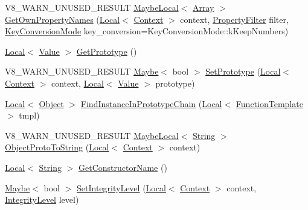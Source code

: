 \begin{DoxyCompactItemize}
\item 
V8\+\_\+\+W\+A\+R\+N\+\_\+\+U\+N\+U\+S\+E\+D\+\_\+\+R\+E\+S\+U\+LT \mbox{\hyperlink{classv8_1_1MaybeLocal}{Maybe\+Local}}$<$ \mbox{\hyperlink{classv8_1_1Array}{Array}} $>$ \mbox{\hyperlink{classv8_1_1Object_a345cc5b8e646c89bdf03b76f60544c91}{Get\+Own\+Property\+Names}} (\mbox{\hyperlink{classv8_1_1Local}{Local}}$<$ \mbox{\hyperlink{classv8_1_1Context}{Context}} $>$ context, \mbox{\hyperlink{namespacev8_afbf02b6b1152a3e25d7bde90798209ac}{Property\+Filter}} filter, \mbox{\hyperlink{namespacev8_aa65aeff871614520d8033dead4b34e38}{Key\+Conversion\+Mode}} key\+\_\+conversion=Key\+Conversion\+Mode\+::k\+Keep\+Numbers)
\item 
\mbox{\hyperlink{classv8_1_1Local}{Local}}$<$ \mbox{\hyperlink{classv8_1_1Value}{Value}} $>$ \mbox{\hyperlink{classv8_1_1Object_ae8d3fed7d6dbd667c29cabb3039fe7af}{Get\+Prototype}} ()
\item 
V8\+\_\+\+W\+A\+R\+N\+\_\+\+U\+N\+U\+S\+E\+D\+\_\+\+R\+E\+S\+U\+LT \mbox{\hyperlink{classv8_1_1Maybe}{Maybe}}$<$ bool $>$ \mbox{\hyperlink{classv8_1_1Object_a1f1fc25d2a440ad2a8b7d94db04f88fb}{Set\+Prototype}} (\mbox{\hyperlink{classv8_1_1Local}{Local}}$<$ \mbox{\hyperlink{classv8_1_1Context}{Context}} $>$ context, \mbox{\hyperlink{classv8_1_1Local}{Local}}$<$ \mbox{\hyperlink{classv8_1_1Value}{Value}} $>$ prototype)
\item 
\mbox{\hyperlink{classv8_1_1Local}{Local}}$<$ \mbox{\hyperlink{classv8_1_1Object}{Object}} $>$ \mbox{\hyperlink{classv8_1_1Object_ae2ad9fee9db6e0e5da56973ebb8ea2bc}{Find\+Instance\+In\+Prototype\+Chain}} (\mbox{\hyperlink{classv8_1_1Local}{Local}}$<$ \mbox{\hyperlink{classv8_1_1FunctionTemplate}{Function\+Template}} $>$ tmpl)
\item 
V8\+\_\+\+W\+A\+R\+N\+\_\+\+U\+N\+U\+S\+E\+D\+\_\+\+R\+E\+S\+U\+LT \mbox{\hyperlink{classv8_1_1MaybeLocal}{Maybe\+Local}}$<$ \mbox{\hyperlink{classv8_1_1String}{String}} $>$ \mbox{\hyperlink{classv8_1_1Object_a7a65552d78eff4a1b9755f99167f4255}{Object\+Proto\+To\+String}} (\mbox{\hyperlink{classv8_1_1Local}{Local}}$<$ \mbox{\hyperlink{classv8_1_1Context}{Context}} $>$ context)
\item 
\mbox{\hyperlink{classv8_1_1Local}{Local}}$<$ \mbox{\hyperlink{classv8_1_1String}{String}} $>$ \mbox{\hyperlink{classv8_1_1Object_a7bbe987794658f20a3ec1b68326305e6}{Get\+Constructor\+Name}} ()
\item 
\mbox{\hyperlink{classv8_1_1Maybe}{Maybe}}$<$ bool $>$ \mbox{\hyperlink{classv8_1_1Object_ac45163422a18bb7481cc78fcacecb301}{Set\+Integrity\+Level}} (\mbox{\hyperlink{classv8_1_1Local}{Local}}$<$ \mbox{\hyperlink{classv8_1_1Context}{Context}} $>$ context, \mbox{\hyperlink{namespacev8_a02642d03ff1eecc2fd358626499c2e30}{Integrity\+Level}} level)

\end{DoxyCompactItemize}
